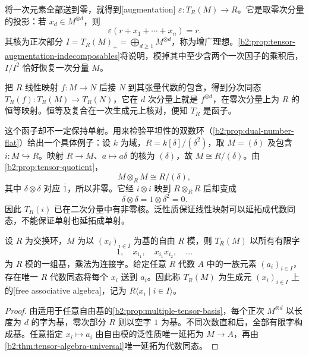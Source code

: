\ProseParagraphBreak
将一次元素全部送到零，就得到[augmentation] \(\varepsilon:T_R(M)\rightarrow R\)。它是取零次分量的投影：若 \(x_d\in M^{\otimes d}\)，则
\[
	\varepsilon(r+x_1+\cdots+x_n)=r.
\]
其核为正次部分 \(I=T_R(M)_+=\bigoplus_{d\ge1}M^{\otimes d}\)，称为增广理想。\cref{b2:prop:tensor-augmentation-indecomposables}将说明，模掉其中至少含两个一次因子的乘积后，\(I/I^2\) 恰好恢复一次分量 \(M\)。

\ProseParagraphBreak
把 \(R\) 线性映射 \(f:M\rightarrow N\) 后接 \(N\) 到其张量代数的包含，得到分次同态 \(T_R(f):T_R(M)\rightarrow T_R(N)\)，它在 \(d\) 次分量上就是 \(f^{\otimes d}\)，在零次分量上为 \(R\) 的恒等映射。恒等及复合在一次生成元上核对，便知 \(T_R\) 是函子。

\ProseParagraphBreak
这个函子却不一定保持单射。用来检验平坦性的双数环（\cref{b2:prop:dual-number-flat}）给出一个具体例子：设 \(k\) 为域，\(R=k[\delta]/(\delta^2)\)，取 \(M=(\delta)\) 及包含 \(i:M\hookrightarrow R\)。映射 \(R\rightarrow M\)、\(a\mapsto a\delta\) 的核为 \((\delta)\)，故 \(M\cong R/(\delta)\)。由\cref{b2:prop:tensor-quotient}，
\[
	M\otimes_RM\cong R/(\delta),
\]
其中 \(\delta\otimes\delta\) 对应 \(\bar1\)，所以非零。它经 \(i\otimes i\) 映到 \(R\otimes_RR\) 后却变成
\[
	\delta\otimes\delta=1\otimes\delta^2=0.
\]
因此 \(T_R(i)\) 已在二次分量中有非零核。泛性质保证线性映射可以延拓成代数同态，不能保证单射也延拓成单射。

\begin{proposition}\label{b2:prop:free-associative-algebra}
	设 \(R\) 为交换环，\(M\) 为以 \((x_i)_{i\in I}\) 为基的自由 \(R\) 模，则 \(T_R(M)\) 以所有有限字
	\[
		1,\quad x_{i_1},\quad x_{i_1}x_{i_2},\quad\ldots
	\]
	为 \(R\) 模的一组基，乘法为连接字。给定任意 \(R\) 代数 \(A\) 中的一族元素 \((a_i)_{i\in I}\)，存在唯一 \(R\) 代数同态将每个 \(x_i\) 送到 \(a_i\)。因此称 \(T_R(M)\) 为生成元 \((x_i)_{i\in I}\) 上的[free associative algebra]，记为 \(R\langle x_i\mid i\in I\rangle\)。
\end{proposition}
\begin{proof}
	由适用于任意自由基的\cref{b2:prop:multiple-tensor-basis}，每个正次 \(M^{\otimes d}\) 以长度为 \(d\) 的字为基，零次部分 \(R\) 则以空字 \(1\) 为基。不同次数直和后，全部有限字构成基。任意指定 \(x_i\mapsto a_i\) 由自由模的泛性质唯一延拓为 \(M\rightarrow A\)，再由\cref{b2:thm:tensor-algebra-universal}唯一延拓为代数同态。
\end{proof}

